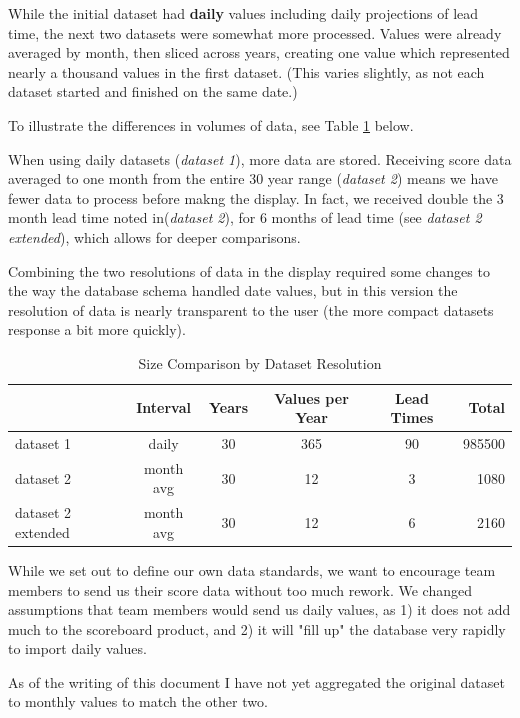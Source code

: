 \documentclass[logos,parttoc,morelanguage=french,morelanguage=german,draft]{orsay-memoire}
\begin{document}
While the initial dataset had \textbf{daily} values including daily projections of lead time, the next two datasets were somewhat more processed. Values were already averaged by month, then sliced across years, creating one value which represented nearly a thousand values in the first dataset. (This varies slightly, as not each dataset started and finished on the same date.)

To illustrate the differences in volumes of data, see Table \ref{tbl:origDatasetCompare} below.

When using daily datasets (\textit{dataset 1}), more data are stored. Receiving score data averaged to one month from the entire 30 year range (\textit{dataset 2}) means we have fewer data to process before makng the display. In fact, we received double the 3 month lead time noted in(\textit{dataset 2}), for 6 months of lead time (see \textit{dataset 2 extended}), which allows for deeper comparisons.

Combining the two resolutions of data in the display required some changes to the way the database schema handled date values, but in this version the resolution of data is nearly transparent to the user (the more compact datasets response a bit more quickly).

\begin{table}[h]
\centering
\begin{tabular}{@{}lccccr@{}}
\toprule
 & Interval & Years & Values per Year & Lead Times & Total \\ \midrule
dataset 1 & daily & 30 & 365 & 90 & 985500 \\
dataset 2 & month avg & 30 & 12 & 3 & 1080 \\
dataset 2 extended & month avg & 30 & 12 & 6 & 2160 \\ \bottomrule
\end{tabular}
\caption{Size Comparison by Dataset Resolution}
\label{tbl:origDatasetCompare}
\end{table}

While we set out to define our own data standards, we want to encourage team members to send us their score data without too much rework. We changed assumptions that team members would send us daily values, as 1) it does not add much to the scoreboard product, and 2) it will "fill up" the database very rapidly to import daily values.

As of the writing of this document I have not yet aggregated the original dataset to monthly values to match the other two.
\end{document}
